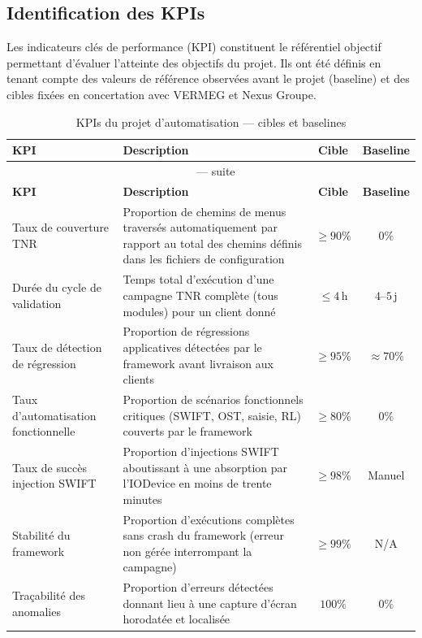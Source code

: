 \documentclass[12pt, a4paper]{report}
\begin{document}
\subsection{Identification des KPIs}

Les indicateurs clés de performance (KPI) constituent le référentiel objectif permettant d'évaluer l'atteinte des objectifs du projet. Ils ont été définis en tenant compte des valeurs de référence observées avant le projet (baseline) et des cibles fixées en concertation avec VERMEG et Nexus Groupe.

\begin{longtable}{@{}p{4.8cm}p{5.7cm}cc@{}}
\caption{KPIs du projet d'automatisation — cibles et baselines}
\label{tab:kpis}\\
\toprule
\textbf{KPI} & \textbf{Description} & \textbf{Cible} & \textbf{Baseline} \\
\midrule
\endfirsthead
\multicolumn{4}{c}{\tablename~\thetable{} — suite}\\
\toprule
\textbf{KPI} & \textbf{Description} & \textbf{Cible} & \textbf{Baseline} \\
\midrule
\endhead
\bottomrule
\endlastfoot
Taux de couverture TNR
  & Proportion de chemins de menus traversés automatiquement par rapport au total des chemins définis dans les fichiers de configuration
  & $\geq 90\%$
  & $0\%$ \\[4pt]
Durée du cycle de validation
  & Temps total d'exécution d'une campagne TNR complète (tous modules) pour un client donné
  & $\leq 4\,\text{h}$
  & $4\text{–}5\,\text{j}$ \\[4pt]
Taux de détection de régression
  & Proportion de régressions applicatives détectées par le framework avant livraison aux clients
  & $\geq 95\%$
  & $\approx 70\%$ \\[4pt]
Taux d'automatisation fonctionnelle
  & Proportion de scénarios fonctionnels critiques (SWIFT, OST, saisie, RL) couverts par le framework
  & $\geq 80\%$
  & $0\%$ \\[4pt]
Taux de succès injection SWIFT
  & Proportion d'injections SWIFT aboutissant à une absorption par l'IODevice en moins de trente minutes
  & $\geq 98\%$
  & Manuel \\[4pt]
Stabilité du framework
  & Proportion d'exécutions complètes sans crash du framework (erreur non gérée interrompant la campagne)
  & $\geq 99\%$
  & N/A \\[4pt]
Traçabilité des anomalies
  & Proportion d'erreurs détectées donnant lieu à une capture d'écran horodatée et localisée
  & $100\%$
  & $0\%$ \\
\end{longtable}
\end{document}
